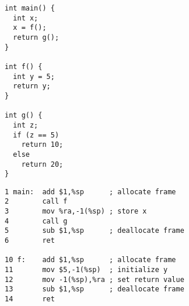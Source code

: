 \documentclass[acmsmall,review,anonymous]{acmart}\settopmatter{printfolios=true,printccs=false,printacmref=false}
\begin{document}
\begin{figure}

\begin{subfigure}{.2\textwidth}
  {\small
\begin{verbatim}
int main() {
  int x;
  x = f();
  return g();
}

int f() {
  int y = 5;
  return y;
}

int g() {
  int z;
  if (z == 5)
    return 10;
  else
    return 20;
}
\end{verbatim}
}
\end{subfigure}
\begin{subfigure}{.7\textwidth}
  {\small
\begin{verbatim}
1 main:  add $1,%sp      ; allocate frame
2        call f
3        mov %ra,-1(%sp) ; store x
4        call g
5        sub $1,%sp      ; deallocate frame
6        ret

10 f:    add $1,%sp      ; allocate frame
11       mov $5,-1(%sp)  ; initialize y
12       mov -1(%sp),%ra ; set return value
13       sub $1,%sp      ; deallocate frame
14       ret


\end{verbatim}}
\end{subfigure}
\end{figure}
\end{document}
